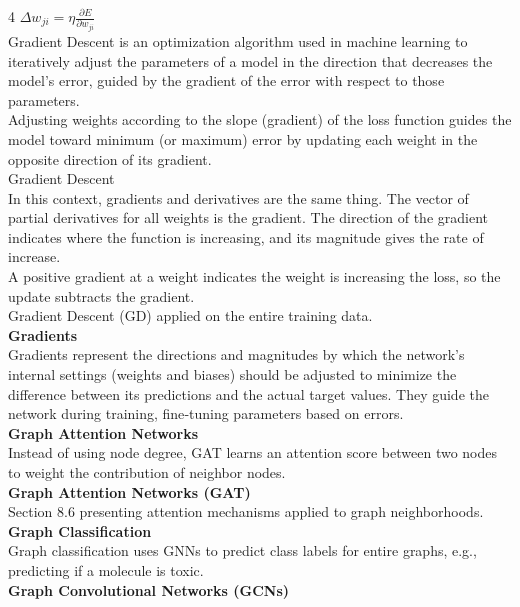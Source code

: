 \documentclass[8pt]{extarticle}
\begin{document}
\begin{multicols}{4}
$ \Delta w_{ji} = \eta \frac{\partial E}{\partial w_{ji}} $\\
Gradient Descent is an optimization algorithm used in machine learning to iteratively adjust the parameters of a model in the direction that decreases the model’s error, guided by the gradient of the error with respect to those parameters.\\
Adjusting weights according to the slope (gradient) of the loss function guides the model toward minimum (or maximum) error by updating each weight in the opposite direction of its gradient.\\
Gradient Descent\\
In this context, gradients and derivatives are the same thing. The vector of partial derivatives for all weights is the gradient. The direction of the gradient indicates where the function is increasing, and its magnitude gives the rate of increase.\\
A positive gradient at a weight indicates the weight is increasing the loss, so the update subtracts the gradient.\\
Gradient Descent (GD) applied on the entire training data.\\
\vspace{2pt}\textbf{Gradients}\\
Gradients represent the directions and magnitudes by which the network’s internal settings (weights and biases) should be adjusted to minimize the difference between its predictions and the actual target values. They guide the network during training, fine‑tuning parameters based on errors.\\
\vspace{2pt}\textbf{Graph Attention Networks}\\
Instead of using node degree, GAT learns an attention score between two nodes to weight the contribution of neighbor nodes.\\
\vspace{2pt}\textbf{Graph Attention Networks (GAT)}\\
Section 8.6 presenting attention mechanisms applied to graph neighborhoods.\\
\vspace{2pt}\textbf{Graph Classification}\\
Graph classification uses GNNs to predict class labels for entire graphs, e.g., predicting if a molecule is toxic.\\
\vspace{2pt}\textbf{Graph Convolutional Networks (GCNs)}\\

\end{multicols}
\end{document}
